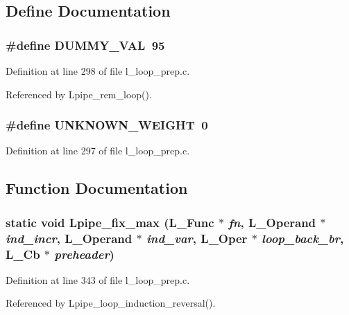 \subsection{Define Documentation}
\subsubsection{\setlength{\rightskip}{0pt plus 5cm}\#define DUMMY\_\-VAL~95}\label{l__loop__prep_8c_56e0504cd80a4cf785e7d94588e099fb}




Definition at line 298 of file l\_\-loop\_\-prep.c.

Referenced by Lpipe\_\-rem\_\-loop().
\subsubsection{\setlength{\rightskip}{0pt plus 5cm}\#define UNKNOWN\_\-WEIGHT~0}\label{l__loop__prep_8c_c697651b01b512ea5feb51514bde3b69}




Definition at line 297 of file l\_\-loop\_\-prep.c.

\subsection{Function Documentation}
\subsubsection{\setlength{\rightskip}{0pt plus 5cm}static void Lpipe\_\-fix\_\-max (L\_\-Func $\ast$ {\em fn}, L\_\-Operand $\ast$ {\em ind\_\-incr}, L\_\-Operand $\ast$ {\em ind\_\-var}, L\_\-Oper $\ast$ {\em loop\_\-back\_\-br}, L\_\-Cb $\ast$ {\em preheader})\hspace{0.3cm}{\tt  [static]}}\label{l__loop__prep_8c_e9566433a68082088c8d7df1cd73bc6f}




Definition at line 343 of file l\_\-loop\_\-prep.c.

Referenced by Lpipe\_\-loop\_\-induction\_\-reversal().

